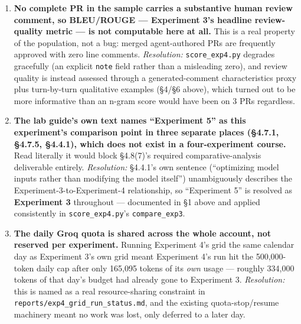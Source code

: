 \documentclass{experimentreport}
\begin{document}
{\begin{enumerate}
\item \textbf{No complete PR in the sample carries a substantive human review comment, so BLEU/ROUGE
--- Experiment 3's headline review-quality metric --- is not computable here at all.} This is a real
property of the population, not a bug: merged agent-authored PRs are frequently approved with zero
line comments. \emph{Resolution:} \texttt{score\_exp4.py} degrades gracefully (an explicit
\texttt{note} field rather than a misleading zero), and review quality is instead assessed through a
generated-comment characteristics proxy plus turn-by-turn qualitative examples (\S4/\S6 above), which
turned out to be more informative than an n-gram score would have been on 3 PRs regardless.

\item \textbf{The lab guide's own text names ``Experiment 5'' as this experiment's comparison point
in three separate places (\S4.7.1, \S4.7.5, \S4.4.1), which does not exist in a four-experiment
course.} Read literally it would block \S4.8(7)'s required comparative-analysis deliverable entirely.
\emph{Resolution:} \S4.4.1's own sentence (``optimizing model inputs rather than modifying the model
itself'') unambiguously describes the Experiment-3-to-Experiment-4 relationship, so ``Experiment 5''
is resolved as \textbf{Experiment 3} throughout --- documented in \S1 above and applied consistently
in \texttt{score\_exp4.py}'s \texttt{compare\_exp3}.

\item \textbf{The daily Groq quota is shared across the whole account, not reserved per experiment.}
Running Experiment 4's grid the same calendar day as Experiment 3's own grid meant Experiment 4's run
hit the 500{,}000-token daily cap after only 165{,}095 tokens of its \emph{own} usage --- roughly
334{,}000 tokens of that day's budget had already gone to Experiment 3. \emph{Resolution:} this is
named as a real resource-sharing constraint in \texttt{reports/exp4\_grid\_run\_status.md}, and the
existing quota-stop/resume machinery meant no work was lost, only deferred to a later day.

\end{enumerate}

}

\end{document}
